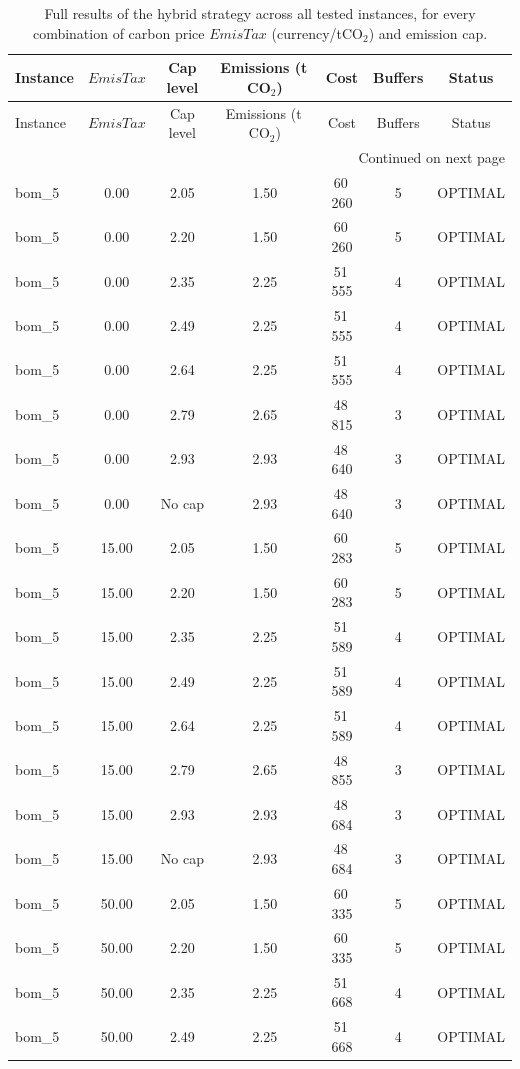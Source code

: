 \begingroup\scriptsize
\setlength{\tabcolsep}{3pt}
\begin{longtable}{lcccccc}
\caption{Full results of the hybrid strategy across all tested instances, for every combination of carbon price $EmisTax$ (currency/tCO$_2$) and emission cap.}\label{tab:hybridfull}\\
\toprule
Instance & $EmisTax$ & Cap level & Emissions (t\,CO$_2$) & Cost & Buffers & Status\\
\midrule
\endfirsthead
\toprule
Instance & $EmisTax$ & Cap level & Emissions (t\,CO$_2$) & Cost & Buffers & Status\\
\midrule
\endhead
\midrule
\multicolumn{7}{r}{Continued on next page}\\
\endfoot
\bottomrule
\endlastfoot
bom\_5 & 0.00 & 2.05 & 1.50 & 60\,260 & 5 & OPTIMAL \\
bom\_5 & 0.00 & 2.20 & 1.50 & 60\,260 & 5 & OPTIMAL \\
bom\_5 & 0.00 & 2.35 & 2.25 & 51\,555 & 4 & OPTIMAL \\
bom\_5 & 0.00 & 2.49 & 2.25 & 51\,555 & 4 & OPTIMAL \\
bom\_5 & 0.00 & 2.64 & 2.25 & 51\,555 & 4 & OPTIMAL \\
bom\_5 & 0.00 & 2.79 & 2.65 & 48\,815 & 3 & OPTIMAL \\
bom\_5 & 0.00 & 2.93 & 2.93 & 48\,640 & 3 & OPTIMAL \\
bom\_5 & 0.00 & No cap & 2.93 & 48\,640 & 3 & OPTIMAL \\
bom\_5 & 15.00 & 2.05 & 1.50 & 60\,283 & 5 & OPTIMAL \\
bom\_5 & 15.00 & 2.20 & 1.50 & 60\,283 & 5 & OPTIMAL \\
bom\_5 & 15.00 & 2.35 & 2.25 & 51\,589 & 4 & OPTIMAL \\
bom\_5 & 15.00 & 2.49 & 2.25 & 51\,589 & 4 & OPTIMAL \\
bom\_5 & 15.00 & 2.64 & 2.25 & 51\,589 & 4 & OPTIMAL \\
bom\_5 & 15.00 & 2.79 & 2.65 & 48\,855 & 3 & OPTIMAL \\
bom\_5 & 15.00 & 2.93 & 2.93 & 48\,684 & 3 & OPTIMAL \\
bom\_5 & 15.00 & No cap & 2.93 & 48\,684 & 3 & OPTIMAL \\
bom\_5 & 50.00 & 2.05 & 1.50 & 60\,335 & 5 & OPTIMAL \\
bom\_5 & 50.00 & 2.20 & 1.50 & 60\,335 & 5 & OPTIMAL \\
bom\_5 & 50.00 & 2.35 & 2.25 & 51\,668 & 4 & OPTIMAL \\
bom\_5 & 50.00 & 2.49 & 2.25 & 51\,668 & 4 & OPTIMAL \\

\end{longtable}
